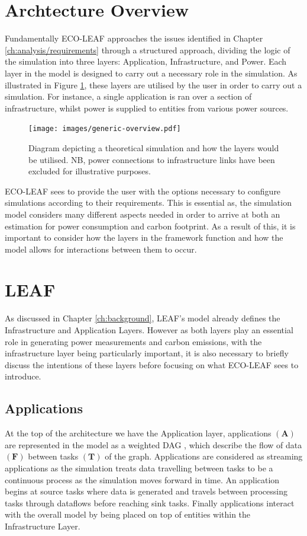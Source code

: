 \documentclass{l4proj}
\begin{document}
\section{Archtecture Overview}\label{sec:architecture-overview}
Fundamentally ECO-LEAF approaches the issues identified in Chapter \ref{ch:analysis/requirements} through a structured approach, dividing the logic of the simulation into three layers: Application, Infrastructure, and Power.
Each layer in the model is designed to carry out a necessary role in the simulation.
As illustrated in Figure \ref{fig:generic-overview}, these layers are utilised by the user in order to carry out a simulation.
For instance, a single application is ran over a section of infrastructure, whilst power is supplied to entities from various power sources.

\begin{figure}[htbp]
    \centering
    \texttt{[image: images/generic-overview.pdf]}
    ~
    \caption{Diagram depicting a theoretical simulation and how the layers would be utilised. NB, power connections to infrastructure links have been excluded for illustrative purposes.}
    \label{fig:generic-overview}
\end{figure}

ECO-LEAF sees to provide the user with the options necessary to configure simulations according to their requirements.
This is essential as, the simulation model considers many different aspects needed in order to arrive at both an estimation for power consumption and carbon footprint.
As a result of this, it is important to consider how the layers in the framework function and how the model allows for interactions between them to occur.

\section{LEAF}\label{sec:LEAF}
As discussed in Chapter \ref{ch:background}, LEAF's model already defines the Infrastructure and Application Layers.
However as both layers play an essential role in generating power measurements and carbon emissions, with the infrastructure layer being particularly important, it is also necessary to briefly discuss the intentions of these layers before focusing on what ECO-LEAF sees to introduce.

\subsection{Applications}\label{subsec:applications}
At the top of the architecture we have the Application layer, applications $\mathbf{(A)}$ are represented in the model as a weighted DAG \citep{leaf2021}, which describe the flow of data $\mathbf{(F)}$ between tasks $\mathbf{(T)}$ of the graph.
Applications are considered as streaming applications as the simulation treats data travelling between tasks to be a continuous process as the simulation moves forward in time.
An application begins at source tasks where data is generated and travels between processing tasks through dataflows before reaching sink tasks.
Finally applications interact with the overall model by being placed on top of entities within the Infrastructure Layer.
\end{document}
